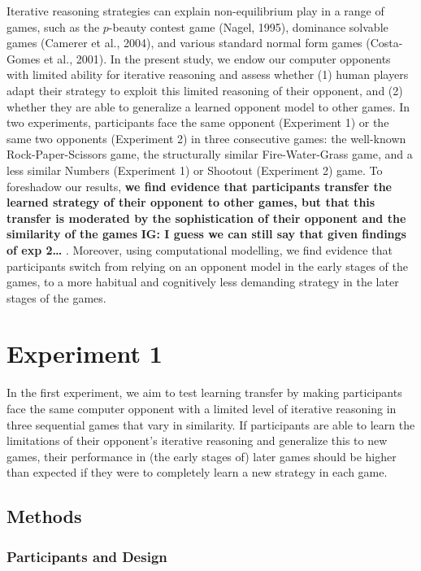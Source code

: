 \documentclass[man,floatsintext]{apa6}
\begin{document}
Iterative reasoning strategies can explain non-equilibrium play in a range of games, such as the \(p\)-beauty contest game (Nagel, 1995), dominance solvable games (Camerer et al., 2004), and various standard normal form games (Costa-Gomes et al., 2001). In the present study, we endow our computer opponents with limited ability for iterative reasoning and assess whether (1) human players adapt their strategy to exploit this limited reasoning of their opponent, and (2) whether they are able to generalize a learned opponent model to other games. In two experiments, participants face the same opponent (Experiment 1) or the same two opponents (Experiment 2) in three consecutive games: the well-known Rock-Paper-Scissors game, the structurally similar Fire-Water-Grass game, and a less similar Numbers (Experiment 1) or Shootout (Experiment 2) game. To foreshadow our results, \textbf{we find evidence that participants transfer the learned strategy of their opponent to other games, but that this transfer is moderated by the sophistication of their opponent and the similarity of the games} \textbf{IG: I guess we can still say that given findings of exp 2\ldots{}} . Moreover, using computational modelling, we find evidence that participants switch from relying on an opponent model in the early stages of the games, to a more habitual and cognitively less demanding strategy in the later stages of the games.

\hypertarget{experiment-1}{%
\section{Experiment 1}\label{experiment-1}}

In the first experiment, we aim to test learning transfer by making participants face the same computer opponent with a limited level of iterative reasoning in three sequential games that vary in similarity. If participants are able to learn the limitations of their opponent's iterative reasoning and generalize this to new games, their performance in (the early stages of) later games should be higher than expected if they were to completely learn a new strategy in each game.

\hypertarget{methods}{%
\subsection{Methods}\label{methods}}

\hypertarget{participants-and-design}{%
\subsubsection{Participants and Design}\label{participants-and-design}}
\end{document}
